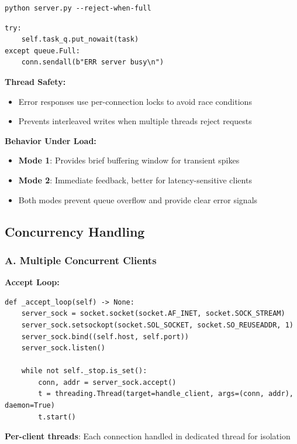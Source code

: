 \documentclass[12pt]{article}
\begin{document}
\begin{verbatim}
python server.py --reject-when-full
\end{verbatim}

\begin{lstlisting}
try:
    self.task_q.put_nowait(task)
except queue.Full:
    conn.sendall(b"ERR server busy\n")
\end{lstlisting}

\textbf{Thread Safety:}
\begin{itemize}
    \item Error responses use per-connection locks to avoid race conditions
    \item Prevents interleaved writes when multiple threads reject requests
\end{itemize}

\textbf{Behavior Under Load:}
\begin{itemize}
    \item \textbf{Mode 1}: Provides brief buffering window for transient spikes
    \item \textbf{Mode 2}: Immediate feedback, better for latency-sensitive clients
    \item Both modes prevent queue overflow and provide clear error signals
\end{itemize}

\subsection{Concurrency Handling}

\subsubsection{A. Multiple Concurrent Clients}

\textbf{Accept Loop:}
\begin{lstlisting}
def _accept_loop(self) -> None:
    server_sock = socket.socket(socket.AF_INET, socket.SOCK_STREAM)
    server_sock.setsockopt(socket.SOL_SOCKET, socket.SO_REUSEADDR, 1)
    server_sock.bind((self.host, self.port))
    server_sock.listen()
    
    while not self._stop.is_set():
        conn, addr = server_sock.accept()
        t = threading.Thread(target=handle_client, args=(conn, addr), daemon=True)
        t.start()
\end{lstlisting}

\textbf{Per-client threads}: Each connection handled in dedicated thread for isolation
\end{document}
